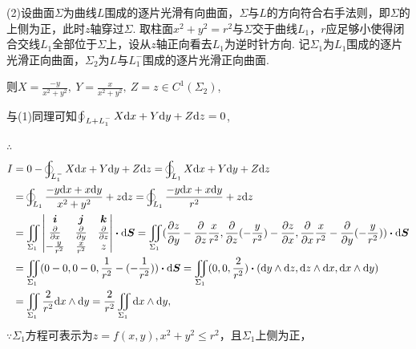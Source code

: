 \documentclass[12pt,UTF8,fleqn]{ctexart}
\newcommand{\BLOInt}[2]{\varoint\nolimits_{#1}#2}
\newcommand{\md}[1]{\mathrm d#1}
\newcommand{\BSIInt}[2]{\iint\limits_{#1}#2}
\newcommand{\pp}[2]{\frac{\partial #1}{\partial #2}}
\begin{document}
\begin{enumerate}
(2)设曲面$\Sigma$为曲线$L$围成的逐片光滑有向曲面，$\Sigma$与$L$的方向符合右手法则，即$\Sigma$的上侧为正，此时$z$轴穿过$\Sigma$. 取柱面$x^2+y^2=r^2$与$\Sigma$交于曲线$L_1$，$r$应足够小使得闭合交线$L_1$全部位于$\Sigma$上，设从$z$轴正向看去$L_1$为逆时针方向. 记$\Sigma_1$为$L_1$围成的逐片光滑正向曲面，$\Sigma_2$为$L$与$L_1^-$围成的逐片光滑正向曲面.

则$X=\frac{-y}{x^2+y^2},\ Y=\frac x{x^2+y^2},\ Z=z\in C^1(\Sigma_2)$,

与(1)同理可知$\BLOInt{L+L_1^-}{X\md x+Y\md y+Z\md z}=0$,

$\therefore$
\[\begin{aligned}
I&=0-\BLOInt{L_1^-}{X\md x+Y\md y+Z\md z}=\BLOInt{L_1}{X\md x+Y\md y+Z\md z}\\
&=\BLOInt{L_1}{\frac{-y\md x+x\md y}{x^2+y^2}+z\md z}=\BLOInt{L_1}{\frac{-y\md x+x\md y}{r^2}+z\md z}\\
&=\BSIInt{\Sigma_1}{\begin{vmatrix}
\bm i&\bm j&\bm k\\
\frac\partial{\partial x}&\frac\partial{\partial y}&\frac\partial{\partial z}\\
-\frac y{r^2}&\frac x{r^2}&z
\end{vmatrix}\bm\cdot\md\bm S}=\BSIInt{\Sigma_1}{(\pp zy-\frac\partial{\partial z}\frac x{r^2},\frac\partial{\partial z}(-\frac y{r^2})-\pp zx,\frac\partial{\partial x}\frac x{r^2}-\frac\partial{\partial y}(-\frac y{r^2}))\bm\cdot\md\bm S}\\
&=\BSIInt{\Sigma_1}{(0-0,0-0,\frac 1{r^2}-(-\frac 1{r^2}))\bm\cdot\md\bm S}=\BSIInt{\Sigma_1}{(0,0,\frac 2{r^2})\bm\cdot(\md y\wedge\md z,\md z\wedge\md x,\md x\wedge\md y)}\\
&=\BSIInt{\Sigma_1}{\frac 2{r^2}\md x\wedge\md y}=\frac 2{r^2}\BSIInt{\Sigma_1}{\md x\wedge\md y},
\end{aligned}\]
$\because\Sigma_1$方程可表示为$z=f(x,y),x^2+y^2\leqslant r^2$，且$\Sigma_1$上侧为正，


\end{enumerate}
\end{document}
